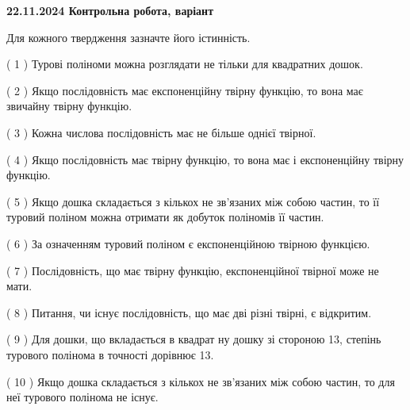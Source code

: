 \documentclass[12pt, ukrainian]{article}
\begin{document}
\vspace{4mm}
\newpage
\begin {large}

\textbf{22.11.2024 Контрольна робота, варіант  }\par


{
Для кожного твердження зазначте його істинність.\par
\vspace{2mm}
( 1 ) Турові поліноми можна розглядати не тільки для квадратних дошок.%

( 2 ) Якщо послідовність має експоненційну твірну функцію, то вона має звичайну твірну функцію.%

( 3 ) Кожна числова послідовність має не більше однієї твірної.%

( 4 ) Якщо послідовність має твірну функцію, то вона має і експоненційну твірну функцію.%

( 5 ) Якщо дошка складається з кількох не зв’язаних між собою частин, то її туровий поліном можна отримати як добуток поліномів її частин.%

( 6 ) За означенням туровий поліном є експоненційною твірною функцією.%

( 7 ) Послідовність, що має твірну функцію, експоненційної твірної може не мати.%

( 8 ) Питання, чи існує послідовність, що має дві різні твірні, є відкритим.%

( 9 ) Для дошки, що вкладається в квадрат ну дошку зі стороною 13, степінь турового полінома в точності дорівнює 13.%

( 10 ) Якщо дошка складається з кількох не зв’язаних між собою частин, то для неї турового полінома не існує.%


\vspace{5mm}
}
\end {large}
\end{document}
